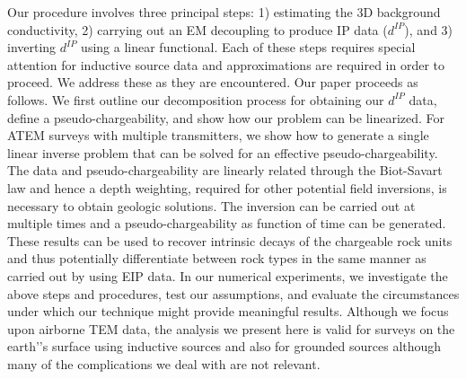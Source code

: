 \documentclass[extra,mreferee]{gji}
\newcommand{\dip}{d^{IP}}
\begin{document}
Our procedure involves three principal steps: 1) estimating the 3D background conductivity, 2) carrying out an EM decoupling to produce IP data ($\dip$), and 3) inverting $\dip$ using a linear functional. Each of these steps requires special attention for inductive source data and approximations are required in order to proceed. We address these as they are encountered. Our paper proceeds as follows. We first outline our decomposition process for obtaining our $\dip$ data, define a pseudo-chargeability, and  show how our problem can be linearized. For ATEM surveys with multiple transmitters, we show how to generate a single linear inverse problem that can be solved for an effective pseudo-chargeability. The data and  pseudo-chargeability are linearly related through the Biot-Savart law and hence a depth weighting, required for other potential field inversions, is necessary to obtain geologic solutions. The inversion can be carried out at multiple times and a pseudo-chargeability as function of time can be generated. These results can be used to recover intrinsic decays of the chargeable rock units and thus potentially differentiate between rock types in the same manner as carried out by \cite{Yuval1997} using EIP data. In our numerical experiments, we investigate the above steps and procedures, test our assumptions, and evaluate the circumstances under which our technique might provide meaningful results. Although  we focus upon airborne TEM data, the analysis we present here is valid for surveys on the earth’'s surface using inductive sources and also for grounded sources although many of the complications we deal with are not relevant. 
    
\end{document}
